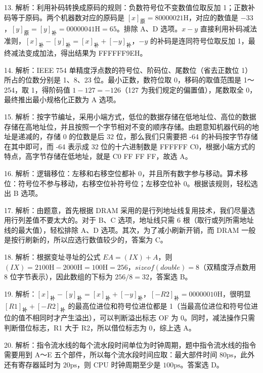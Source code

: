 \documentclass[UTF8,11pt]{ctexart}
\begin{document}
13. 解析：利用补码转换成原码的规则：负数符号位不变数值位取反加 1；正数补码等于原码。两个机器数对应的原码是 \(\displaystyle [x]_{\text{原}}=80000021\mathrm H\)，对应的数值是 \(\displaystyle -33\)，\(\displaystyle [y]_{\text{原}}=[y]_{\text{补}}=00000041\mathrm H=65\)。排除 A、D 选项。\(\displaystyle x-y\) 直接利用补码减法准则，\(\displaystyle [x]_{\text{补}}-[y]_{\text{补}}=[x]_{\text{补}}+[-y]_{\text{补}}\)，\(\displaystyle -y\) 的补码是连同符号位取反加 1，最终减法变成加法，得出结果为 FFFFFF9EH。


14. 解析：IEEE 754 单精度浮点数的符号位、阶码位、尾数位（省去正数位 1）所占的位数分别是 1、8、23 位。最小正数，数符位取 0，移码的取值范围是 1～254，取 1，得阶码值 \(\displaystyle 1-127=-126\)（127 为我们规定的偏置值），尾数取全 0，最终推出最小规格化正数为 A 选项。


15. 解析：按字节编址，采用小端方式，低位的数据存储在低地址位、高位的数据存储在高地址位，并且按照一个字节相对不变的顺序存储。由题意知机器代码的地址是递减的，存储 0 的位数是后 32 位，那么我们只需要把 -64 的补码按字节存储在其中即可，而 -64 表示成 32 位的十六进制数是 FFFFFF C0，根据小端方式的特点，高字节存储在低地址，就是 C0 FF FF FF，故选 A。


16. 解析：逻辑移位：左移和右移空位都补 0，并且所有数字参与移动。算术移位：符号位不参与移动，右移空位补符号位；左移空位补 0。根据该规则，轻松选出 B 选项。


17. 解析：由题意，首先根据 DRAM 采用的是行列地址线复用技术，我们尽量选用行列差值不要太大的。对于 B、C 选项，地址线只需 6 根（取行或列所需地址线的最大值），轻松排除 A、D 选项。其次，为了减小刷新开销，而 DRAM 一般是按行刷新的，所以应选行数值较少的，答案为 C。


18. 解析：根据变址寻址的公式 \(\displaystyle EA=(IX)+A\)，则 \(\displaystyle (IX)=2100\mathrm H-2000\mathrm H=100\mathrm H=256\)，\(\displaystyle sizeof(double)=8\)（双精度浮点数用 8 位字节表示），因此数组的下标为 \(\displaystyle 256/8=32\)，答案选 B。


19. 解析：\(\displaystyle [x]_{\text{补}}-[y]_{\text{补}}=[x]_{\text{补}}+[-y]_{\text{补}}\)，\(\displaystyle [-R2]_{\text{补}}=00000010\mathrm H\)，很明显 \(\displaystyle [R1]_{\text{补}}+[-R2]_{\text{补}}\) 的最高位进位和符号位进位都是 1（当最高位进位和符号位进位的值不相同时才产生溢出），可以判断溢出标志 OF 为 0。同时，减法操作只需判断借位标志，R1 大于 R2，所以借位标志为 0，综上选 A。


20. 解析：指令流水线的每个流水段时间单位为时钟周期，题中指令流水线的指令需要用到 A～E 五个部件，所以每个流水段时间应取：最大部件时间 \(\displaystyle 80\mathrm{ps}\)，此外还有寄存器延时为 \(\displaystyle 20\mathrm{ps}\)，则 CPU 时钟周期至少是 \(\displaystyle 100\mathrm{ps}\)。答案选 D。
\end{document}
